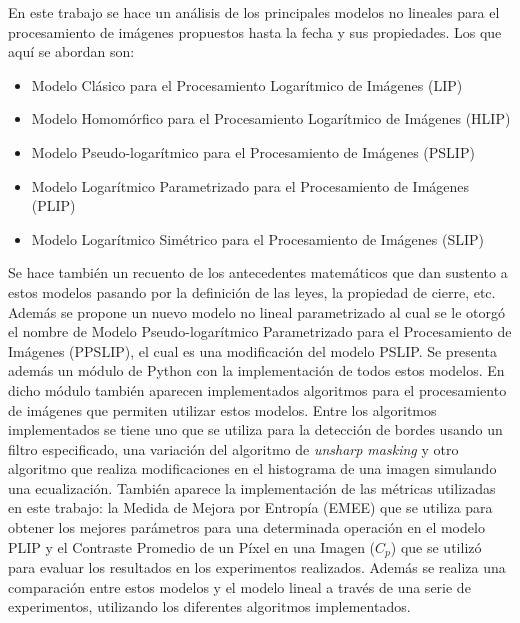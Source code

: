 \begin{resumen}
	En este trabajo se hace un an\'alisis de los principales modelos no lineales para el procesamiento de im\'agenes propuestos hasta la fecha y sus propiedades. Los que aqu\'i se abordan son:
	
	\begin{itemize}
		\item Modelo Cl\'asico para el Procesamiento Logar\'itmico de Im\'agenes (LIP)
		\item Modelo Homom\'orfico para el Procesamiento Logar\'itmico de Im\'agenes (HLIP)
		\item  Modelo Pseudo-logar\'itmico para el Procesamiento de Im\'agenes (PSLIP)
		\item Modelo Logar\'itmico Parametrizado para el Procesamiento de Im\'agenes (PLIP)
		\item Modelo  Logar\'itmico Sim\'etrico para el Procesamiento de Im\'agenes (SLIP)
	\end{itemize}
	
	Se hace tambi\'en un recuento de los antecedentes matem\'aticos que dan sustento a estos modelos pasando por la definici\'on de las leyes, la propiedad de cierre, etc. Adem\'as se propone un nuevo modelo no lineal parametrizado al cual se le otorg\'o el nombre de Modelo Pseudo-logar\'itmico Parametrizado para el Procesamiento de Im\'agenes (PPSLIP), el cual es una modificaci\'on del modelo PSLIP. Se presenta adem\'as un m\'odulo de Python con la implementaci\'on de todos estos modelos. En dicho m\'odulo tambi\'en aparecen implementados algoritmos para el procesamiento de im\'agenes que permiten utilizar estos modelos. Entre los algoritmos implementados se tiene uno que se utiliza para la detecci\'on de bordes usando un filtro especificado, una variaci\'on del algoritmo de \textit{unsharp masking} y otro algoritmo que realiza modificaciones en el histograma de una imagen simulando una ecualizaci\'on. Tambi\'en aparece la implementaci\'on de las m\'etricas utilizadas en este trabajo: la Medida de Mejora por Entropía (EMEE) que se utiliza para obtener los mejores par\'ametros para una determinada operaci\'on en el modelo PLIP y el Contraste Promedio de un P\'ixel en una Imagen ($C_p$) que se utiliz\'o para evaluar los resultados en los experimentos realizados. Adem\'as se realiza una comparaci\'on entre estos modelos y el modelo lineal a trav\'es de una serie de experimentos, utilizando los diferentes algoritmos implementados.
\end{resumen}

